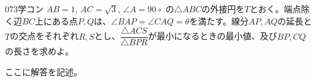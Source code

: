 \begin{thm}{073}{}{学コン}
 $AB=1$, $AC=\sqrt{3}$, $\angle{A}=90\circ$ の$\triangle{ABC}$の外接円を$T$とおく。端点除く辺$BC$上にある点$P, Q$は、$\angle{BAP}=\angle{CAQ}=\theta$を満たす。線分$AP, AQ$の延長と$T$の交点をそれぞれ$R, S$とし、$\dfrac{\triangle{ACS}}{\triangle{BPR}}$が最小になるときの最小値、及び$BP, CQ$の長さを求めよ。
\end{thm}

ここに解答を記述。